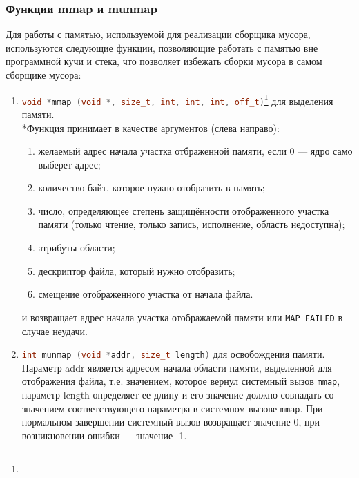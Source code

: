 \subsubsection{Функции mmap и munmap}
Для работы с памятью, используемой для реализации сборщика мусора, используются следующие функции, позволяющие
работать с памятью вне программной кучи и стека, что позволяет избежать сборки мусора в самом сборщике мусора:
\begin{enumerate}
\item \lstinline[language= cpp]{void *mmap (void *, size_t, int, int, int, off_t)}\footnote{}
	для выделения памяти.\\*Функция принимает в качестве аргументов (слева направо):
	\begin{enumerate}
	\item желаемый адрес начала участка отбраженной памяти, если 0 --- ядро само выберет адрес;
	\item количество байт, которое нужно отобразить в память;
	\item число, определяющее степень защищённости отображенного участка памяти (только чтение, только запись, исполнение, область
		недоступна);
	\item атрибуты области;
	\item дескриптор файла, который нужно отобразить;
	\item смещение отображенного участка от начала файла.
	\end{enumerate}
	и возвращает адрес начала участка отображаемой памяти или \lstinline[language= cpp]{MAP_FAILED} в случае неудачи.
\item \lstinline[language= cpp]{int munmap (void *addr, size_t length)} для освобождения памяти.
	Параметр addr является адресом начала области памяти, выделенной для отображения файла, т.е. значением, которое вернул системный вызов \lstinline[language= cpp]{mmap}, параметр length определяет ее длину и его значение должно совпадать со значением соответствующего параметра в системном вызове \lstinline[language= cpp]{mmap}. При нормальном завершении системный вызов возвращает значение 0, при возникновении ошибки --- значение -1.	
\end{enumerate}

